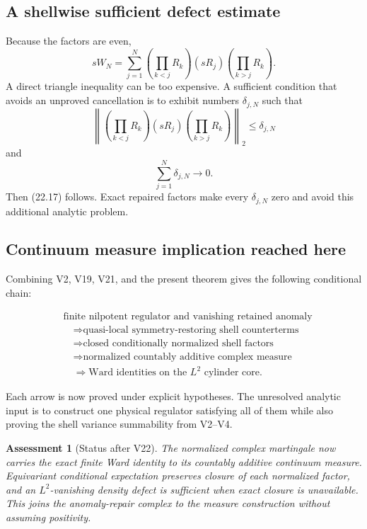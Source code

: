 \documentclass[11pt]{article}
\newtheorem{assessment}[theorem]{Assessment}
\theoremstyle{remark}
\begin{document}
\subsection{A shellwise sufficient defect estimate}

Because the factors are even,
\[
 sW_N
 =
 \sum_{j=1}^N
 \left(\prod_{k<j}R_k\right)
 (sR_j)
 \left(\prod_{k>j}R_k\right).                              \tag{22.21}
\]
A direct triangle inequality can be too expensive.  A sufficient
condition that avoids an unproved cancellation is to exhibit numbers
\(\delta_{j,N}\) such that
\[
 \left\|
 \left(\prod_{k<j}R_k\right)
 (sR_j)
 \left(\prod_{k>j}R_k\right)
 \right\|_2
 \le\delta_{j,N}                                           \tag{22.22}
\]
and
\[
                         \sum_{j=1}^N\delta_{j,N}
 \longrightarrow0.                                        \tag{22.23}
\]
Then (22.17) follows.  Exact repaired factors make every
\(\delta_{j,N}\) zero and avoid this additional analytic problem.

\subsection{Continuum measure implication reached here}

Combining V2, V19, V21, and the present theorem gives the following
conditional chain:

\[
\begin{split}
&\text{finite nilpotent regulator and vanishing retained anomaly}\\
&\quad\Longrightarrow
\text{quasi-local symmetry-restoring shell counterterms}\\
&\quad\Longrightarrow
\text{closed conditionally normalized shell factors}\\
&\quad\Longrightarrow
\text{normalized countably additive complex measure}\\
&\quad\Longrightarrow
\text{Ward identities on the }L^2\text{ cylinder core}.
\end{split}                                                  \tag{22.24}
\]

Each arrow is now proved under explicit hypotheses.  The unresolved
analytic input is to construct one physical regulator satisfying all
of them while also proving the shell variance summability from V2--V4.

\begin{assessment}[Status after V22]
\label{ass:v12v22-status}
The normalized complex martingale now carries the exact finite Ward
identity to its countably additive continuum measure.  Equivariant
conditional expectation preserves closure of each normalized factor,
and an \(L^2\)-vanishing density defect is sufficient when exact
closure is unavailable.  This joins the anomaly-repair complex to the
measure construction without assuming positivity.
\end{assessment}
\end{document}
